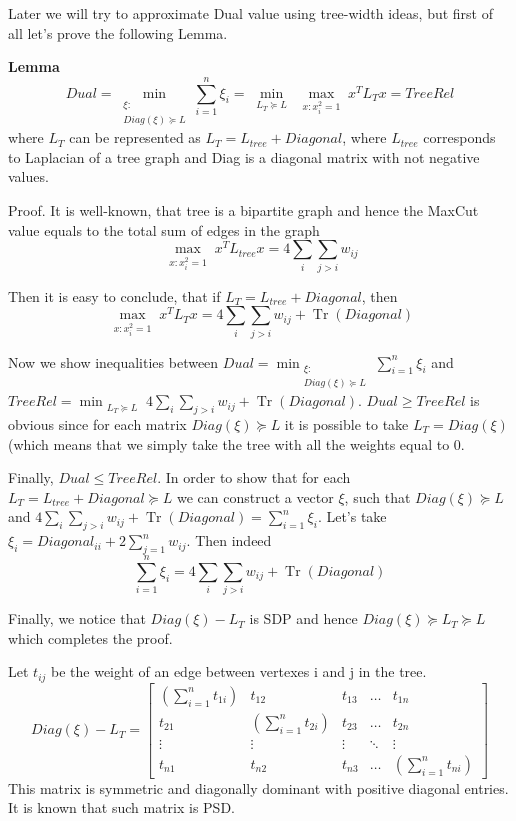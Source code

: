 \documentclass{article}
\DeclareMathOperator{\tr}{Tr}
\begin{document}
Later we will try to approximate Dual value using tree-width ideas, but first of all let's prove the following Lemma.


\textbf{Lemma} 
$$Dual  =  \min_{\substack{\xi: \\  Diag(\xi) \succeq L}} \sum_{i=1}^n{\xi_i} = \min_{\substack{L_T \succeq L}} \max_{\substack{x: x_i^2 = 1}} x^T L_T x = TreeRel$$ where $L_T$ can be represented as $L_T = L_{tree} + Diagonal$, where $L_{tree}$ corresponds to Laplacian of a tree graph and Diag is a diagonal matrix with not negative values.

Proof. It is well-known, that tree is a bipartite graph and hence the MaxCut value equals to the total sum of edges in the graph $$\max_{\substack{x: x_i^2 = 1}} x^T L_{tree} x = 4 \sum_{i} \sum_{j > i} w_{ij}$$

Then it is easy to conclude, that if $L_T = L_{tree} + Diagonal$, then 
$$\max_{\substack{x: x_i^2 = 1}} x^T L_T x = 4 \sum_{i} \sum_{j > i} w_{ij} + \tr(Diagonal)$$

Now we show inequalities between $Dual = \min_{\substack{\xi: \\  Diag(\xi) \succeq L}} \sum_{i=1}^n{\xi_i}$ and $TreeRel = \min_{\substack{L_T \succeq L}} 4 \sum_{i} \sum_{j > i} w_{ij} + \tr(Diagonal)$.
$Dual \ge TreeRel$ is obvious since for each matrix $Diag(\xi) \succeq L$ it is possible to take $L_T = Diag(\xi)$ (which means that we simply take the tree with all the weights equal to 0.

Finally, $Dual \le TreeRel$. In order to show that for each $L_T = L_{tree} + Diagonal \succeq L$ we can construct a vector $\xi$, such that $Diag(\xi) \succeq L$ and $4 \sum_{i} \sum_{j > i} w_{ij} + \tr(Diagonal) = \sum_{i=1}^n{\xi_i}$. Let's take $\xi_i = Diagonal_{ii} + 2 \sum_{j=1}^n w_{ij}$. Then indeed $$\sum_{i=1}^n{\xi_i} = 4 \sum_{i} \sum_{j > i} w_{ij} + \tr(Diagonal)$$ 

Finally, we notice that $Diag(\xi) - L_T$ is SDP and hence $Diag(\xi) \succeq L_T \succeq L$ which completes the proof.

Let $t_{ij}$ be the weight of an edge between vertexes i and j in the tree.  $$Diag(\xi) - L_T = \begin{bmatrix}
    (\sum_{i = 1}^n t_{1i}) & t_{12} & t_{13} & \dots  & t_{1n} \\
    t_{21} & (\sum_{i = 1}^n t_{2i}) & t_{23} & \dots  & t_{2n} \\
    \vdots & \vdots & \vdots & \ddots & \vdots \\
    t_{n1} & t_{n2} & t_{n3} & \dots  & (\sum_{i = 1}^n t_{ni})
\end{bmatrix}$$
This matrix is symmetric and diagonally dominant with positive diagonal entries. It is known that such matrix is PSD. 
\end{document}
